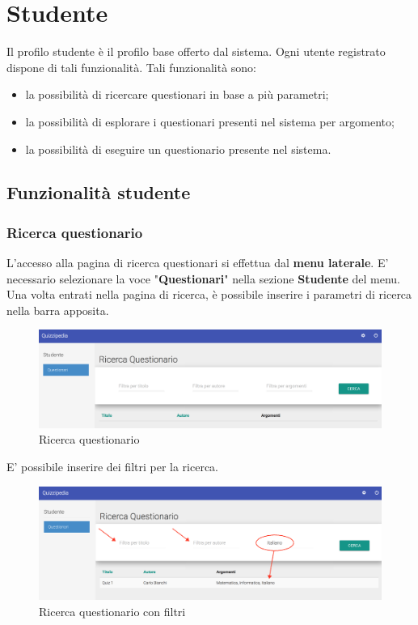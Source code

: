 \documentclass[12pt,a4paper]{article}
\begin{document}
	\newpage

	\section{Studente}\label{studente}
	Il profilo studente è il profilo  base offerto dal sistema. Ogni utente registrato dispone di tali funzionalità. Tali funzionalità sono:
	\begin{itemize}
		\item la possibilità di ricercare questionari in base a più parametri;
		\item la possibilità di esplorare i questionari presenti nel sistema per argomento;
		\item la possibilità di eseguire un questionario presente nel sistema.
	\end{itemize}
	
	\subsection{Funzionalità studente}
	\subsubsection{Ricerca questionario}\label{ricerca_questionario}
	L'accesso alla pagina di ricerca questionari si effettua dal \textbf{menu laterale}. 
	E' necessario selezionare la voce "\textbf{Questionari}" nella sezione \textbf{Studente} del menu.
	Una volta entrati nella pagina di ricerca, è possibile inserire i parametri di ricerca nella barra apposita.
	
	\begin{figure}[H]	
		\centering
		\includegraphics[width=1.0\linewidth]{../img/screenshot/ricercaQuestionario.png}
		\caption{Ricerca questionario}
		\label{Ricerca questionario}
	\end{figure}
	
	E' possibile inserire dei filtri per la ricerca. 
	
	\begin{figure}[H]		
		\centering
		\includegraphics[width=1.0\linewidth]{../img/screenshot/filtriRicerca.png}
		\caption{Ricerca questionario con filtri}
		\label{Ricerca questionario con filtri}
	\end{figure}
	
\end{document}
